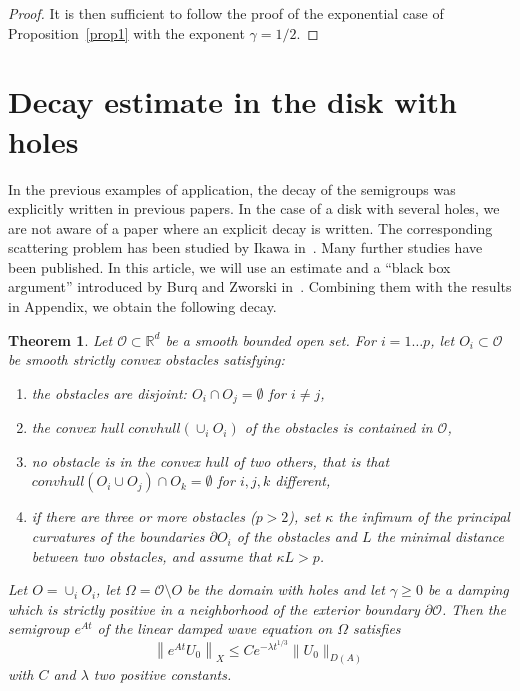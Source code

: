 \documentclass[10pt]{amsart}
\newtheorem{theo}{Theorem}[section]
\theoremstyle{definition}\newtheorem{defi}[theo]{Definition}\newtheorem{rema}[theo]{Remark}\newtheorem{exam}[theo]{Example}\newtheorem{exem}[theo]{Example}\newtheorem{nota}[theo]{Notation}
\newcommand{\RR}{\mathbb{R}}
\newcommand{\Oc}{\mathcal{O}}
\newcommand{\cnvh}{convhull}
\newcommand*{\alphenumi}{\renewcommand*{\theenumi}{\alph{enumi}}}
\begin{document}
\begin{proof}
It is then sufficient to follow the proof of the exponential case of Proposition~\ref{prop1} with the exponent $\gamma=1/2$.
\end{proof}


\section{Decay estimate in the disk with holes}\label{section-decay-disk}
In the previous examples of application, the decay of the semigroups was explicitly written in previous papers. In the case of a disk with several holes, we are not aware of a paper where an explicit decay is written. The corresponding scattering problem has been studied by Ikawa in~\cite{Ikawa1,Ikawa2}. Many further studies have been published. In this article, we will use an estimate and a ``black box argument'' introduced by Burq and Zworski in~\cite{Burq-Zworski}. Combining them with the results in Appendix, we obtain the following decay.

\begin{theo}\label{th-decay-disque-trous}
Let $\Oc\subset\RR^d$ be a smooth bounded open set. For $i=1\ldots p$, let $O_i\subset \Oc$ be smooth strictly convex obstacles satisfying:
\begin{enumerate}\alphenumi
\item \label{listtheo8.1.1}the obstacles are disjoint: $O_i\cap O_j=\emptyset$ for $i\neq j$,
\item \label{listtheo8.1.2}the convex hull $\cnvh(\cup_i O_i)$ of the obstacles is contained in $\Oc$,
\item \label{listtheo8.1.3}no obstacle is in the convex hull of two others, that is that $\cnvh(O_i\cup O_j)\cap O_k =\emptyset$ for $i,j,k$ different,
\item \label{listtheo8.1.4}if there are three or more obstacles ($p>2$), set $\kappa$ the infimum of the principal curvatures of the boundaries $\partial O_i$ of the obstacles and $L$ the minimal distance between two obstacles, and assume that $\kappa L>p$.
\end{enumerate}
Let $O=\cup_i O_i$, let $\Omega=\Oc\setminus O$ be the domain with holes and let $\gamma\geq 0$ be a damping which is strictly positive in a neighborhood of the exterior boundary $\partial \Oc$. Then the semigroup $e^{At}$ of the linear damped wave equation on $\Omega$ satisfies
\[
\left\|e^{At}U_0\right\|_X \leq C e^{-\lambda t^{1/3}} \|U_0\|_{D(A)}
\]
with $C$ and $\lambda$ two positive constants.
\end{theo}
\end{document}
